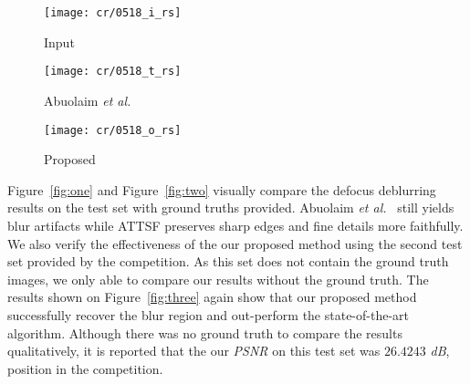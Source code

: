 \documentclass[final]{cvpr}
\begin{document}
\begin{figure*}
        \begin{subfigure}[b]{0.32\textwidth}
                \texttt{[image: cr/0518\_i\_rs]}
                \caption{Input}
        \end{subfigure}\hspace{\fill}
        \begin{subfigure}[b]{0.32\textwidth}
                \texttt{[image: cr/0518\_t\_rs]}
                \caption{Abuolaim \textit{et al.}~\cite{abuolaim2020defocus} }
        \end{subfigure}\hspace{\fill}
        \begin{subfigure}[b]{0.32\textwidth}
                \texttt{[image: cr/0518\_o\_rs]}
                 \caption{Proposed}
        \label{fig:visual}
        \end{subfigure}\hspace{\fill}
       
        \caption{Visual comparison of the proposed algorithm and Abuolaim \textit{et al.}~\cite{abuolaim2020defocus}'s algorithm. Abuolaim \textit{et al.}~\cite{abuolaim2020defocus} fails to produce the non-blur output while the proposed algorithm faithfully remove the blur artifact and generate sharp images.}\label{fig:three}
\end{figure*}


Figure~\ref{fig:one} and Figure~\ref{fig:two} visually compare the defocus deblurring results on the test set with ground truths provided. Abuolaim \textit{et al.}~\cite{abuolaim2020defocus} still yields blur artifacts while ATTSF preserves sharp edges and fine details more faithfully. We also verify the effectiveness of the our proposed method using the second test set provided by the competition. As this set does not contain the ground truth images, we only able to compare our results without the ground truth. The results shown on Figure~\ref{fig:three} again show that our proposed method successfully recover the blur region and out-perform the state-of-the-art algorithm. Although there was no ground truth to compare the results qualitatively, it is reported that the our \textit{PSNR} on this test set was $26.4243$ \textit{dB},  position in the competition.
\end{document}
